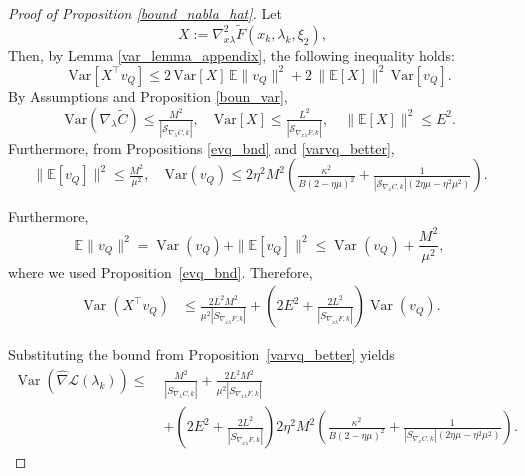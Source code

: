 \documentclass[11pt, twoside]{report}
\begin{document}
\begin{proof}[Proof of Proposition \ref{bound_nabla_hat}]
Let 
\[
X := \nabla_{x \lambda}^2 \tilde{F}(x_k,\lambda_k,\xi_2), \quad 
\]
Then, by Lemma \ref{var_lemma_appendix}, the following inequality holds:
\[
\mathrm{Var}[X^\top v_Q]
\leq 2 \, \mathrm{Var}[X] \, \mathbb{E}\|v_Q\|^2 
+ 2 \, \|\mathbb{E}[X]\|^2 \, \mathrm{Var}[v_Q].
\]
By Assumptions and Proposition \ref{boun_var},
\[
\mathrm{Var}(\nabla_\lambda \tilde{C}) \leq \tfrac{M^2}{|\mathcal{S}_{\nabla_\lambda C,k}|}, 
\quad \mathrm{Var}[X] \leq \tfrac{L^2}{|\mathcal{S}_{\nabla_{x\lambda} F,k}|}, 
\quad \|\mathbb{E}[X]\|^2 \leq E^2.
\]
Furthermore, from Propositions \ref{evq_bnd} and \ref{varvq_better},
\[
\|\mathbb{E}[v_Q]\|^2 \leq \tfrac{M^2}{\mu^2}, 
\quad \mathrm{Var}(v_Q) \leq 2\eta^2 M^2 \left( \tfrac{\kappa^2}{B (2 - \eta \mu)^2} 
+ \tfrac{1}{|\mathcal{S}_{\nabla_x C,k}|(2\eta \mu - \eta^2 \mu^2)} \right).
\]

Furthermore,
\[
\mathbb{E}\|v_Q\|^2
=
\operatorname{Var}(v_Q)
+
\|\mathbb{E}[v_Q]\|^2
\leq
\operatorname{Var}(v_Q)
+
\frac{M^2}{\mu^2},
\]
where we used Proposition~\ref{evq_bnd}. Therefore,
\[
\begin{aligned}
\operatorname{Var}(X^\top v_Q)
&\leq
\frac{2L^2M^2}{\mu^2|S_{\nabla_{x\lambda}F,k}|}
+
\left(
2E^2
+
\frac{2L^2}{|S_{\nabla_{x\lambda}F,k}|}
\right)
\operatorname{Var}(v_Q).
\end{aligned}
\]

Substituting the bound from Proposition~\ref{varvq_better} yields
\[
\begin{aligned}
\operatorname{Var}(\widehat{\nabla}\mathcal{L}(\lambda_k))
\leq\;&
\frac{M^2}{|S_{\nabla_\lambda C,k}|}
+
\frac{2L^2M^2}{\mu^2|S_{\nabla_{x\lambda}F,k}|}
\\
&+
\left(
2E^2
+
\frac{2L^2}{|S_{\nabla_{x\lambda}F,k}|}
\right)
2\eta^2M^2
\left(
\frac{\kappa^2}{B(2-\eta\mu)^2}
+
\frac{1}{|S_{\nabla_x C,k}|(2\eta\mu-\eta^2\mu^2)}
\right).
\end{aligned}
\]


\end{proof}
\end{document}
